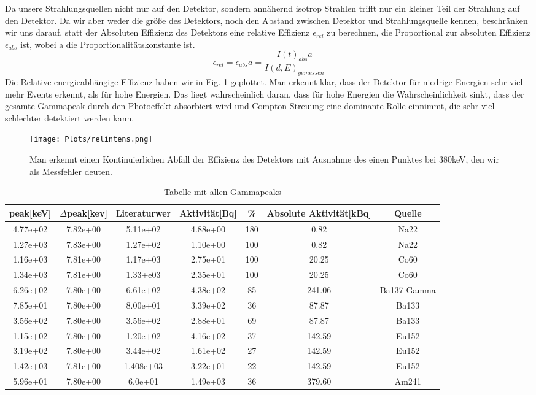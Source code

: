\documentclass[]{article}
\begin{document}
	Da unsere Strahlungsquellen nicht nur auf den Detektor, sondern annähernd isotrop Strahlen trifft nur ein kleiner Teil der Strahlung auf den Detektor. Da wir aber weder die größe des Detektors, noch den Abstand zwischen Detektor und Strahlungsquelle kennen, beschränken wir uns darauf, statt der Absoluten Effizienz des Detektors eine relative Effizienz $\epsilon_{rel}$ zu berechnen, die Proportional zur absoluten Effizienz $\epsilon_{abs}$ ist, wobei a die Proportionalitätskonstante ist.
	\begin{equation}
	\epsilon_{rel}=\epsilon_{abs}a=\frac{I(t)_{abs}a}{I(d,E)_{gemessen}}
	\end{equation}
	Die Relative energieabhängige Effizienz haben wir in Fig. \ref{fig:relintens} geplottet. Man erkennt klar, dass der Detektor für niedrige Energien sehr viel mehr Events erkennt, als für hohe Energien. Das liegt wahrscheinlich daran, dass für hohe Energien die Wahrscheinlichkeit sinkt, dass der gesamte Gammapeak durch den Photoeffekt absorbiert wird und Compton-Streuung eine dominante Rolle einnimmt, die sehr viel schlechter detektiert werden kann.
	\begin{figure}
		\centering
		\texttt{[image: Plots/relintens.png]}
		\caption{Man erkennt einen Kontinuierlichen Abfall der Effizienz des Detektors mit Ausnahme des einen Punktes bei 380keV, den wir als Messfehler deuten. }
		\label{fig:relintens}
	\end{figure}
	
	\begin{table}[H]
		\centering
		\begin{tabular}{|c|c|c|c|c|c|c|}
			\hline
			peak[keV]&$\Delta$peak[kev]&Literaturwer&Aktivität[Bq]&\%&Absolute Aktivität[kBq]&Quelle \\ \hline\hline
			4.77e+02 & 7.82e+00 & 5.11e+02  & 4.88e+00 &180&0.82& Na22\\ \hline
			1.27e+03 & 7.83e+00 & 1.27e+02& 1.10e+00 &100&0.82& Na22\\ \hline
			1.16e+03 & 7.81e+00 & 1.17e+03 & 2.75e+01 &100&20.25& Co60\\ \hline
			1.34e+03 & 7.81e+00 & 1.33+e03& 2.35e+01 &100&20.25& Co60\\ \hline
			6.26e+02 & 7.80e+00 & 6.61e+02 & 4.38e+02 &85&241.06& Ba137 Gamma\\ \hline
			7.85e+01 & 7.80e+00 & 8.00e+01 & 3.39e+02 &36&87.87& Ba133\\ \hline
			3.56e+02 & 7.80e+00 &3.56e+02 & 2.88e+01 &69&87.87& Ba133\\ \hline
			1.15e+02 & 7.80e+00 & 1.20e+02  & 4.16e+02 &37&142.59&Eu152\\ \hline
			3.19e+02 & 7.80e+00 & 3.44e+02 & 1.61e+02 &27&142.59&Eu152\\ \hline
			1.42e+03 & 7.81e+00 & 1.408e+03  & 3.22e+01 &22&142.59&Eu152\\ \hline
			5.96e+01 & 7.80e+00 &6.0e+01 & 1.49e+03 &36&379.60&Am241\\ \hline
			\hline
		\end{tabular}
		\caption{Tabelle mit allen Gammapeaks\label{}}
	\end{table}
\end{document}
